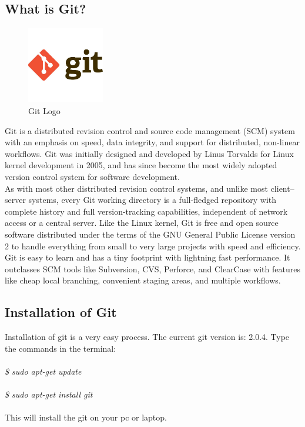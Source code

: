 \subsection{What is Git?}
\begin{figure}[!ht]
\centering
\includegraphics[width=0.3\textwidth]{input/images/git.jpg}                   
\caption{Git Logo}
\hspace{-1.5em}
\end{figure}
Git is a distributed revision control and source code management (SCM) system with an emphasis on speed, data integrity, and support for distributed, non-linear workflows. Git was initially designed and developed by Linus Torvalds for Linux kernel development in 2005, and has since become the most widely adopted version control system for software development.\\

As with most other distributed revision control systems, and unlike most client–server systems, every Git working directory is a full-fledged repository with complete history and full version-tracking capabilities, independent of network access or a central server. Like the Linux kernel, Git is free and open source software distributed under the terms of the GNU General Public License version 2 to handle everything from small to very large projects with speed and efficiency.\\

Git is easy to learn and has a tiny footprint with lightning fast performance. It outclasses SCM tools like Subversion, CVS, Perforce, and ClearCase with features like cheap local branching, convenient staging areas, and multiple workflows.\\

\subsection{Installation of Git}

Installation of git is a very easy process.
The current git version is: 2.0.4.
Type the commands in the terminal:\\\\
\emph{
\$ sudo apt-get update\\\\
\$ sudo apt-get install git\\\\}
This will install the git on your pc or laptop.

